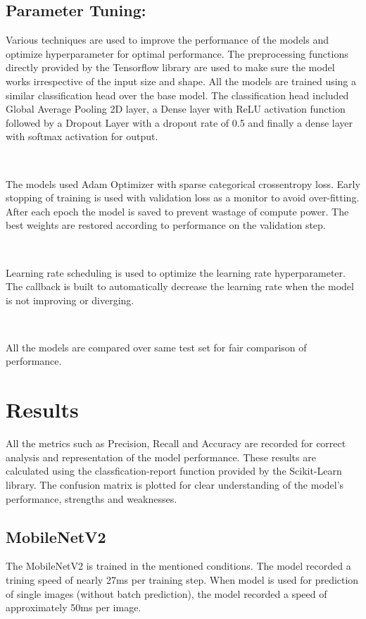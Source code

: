 \subsection{Parameter Tuning:} 

Various techniques are used to improve the performance of the models and optimize hyperparameter for optimal performance. The preprocessing functions directly provided by the Tensorflow library are used to make sure the model works irrespective of the input size and shape. All the models are trained using a similar classification head over the base model. The classification head included Global Average Pooling 2D layer, a Dense layer with ReLU activation function followed by a Dropout Layer with a dropout rate of 0.5 and finally a dense layer with softmax activation for output.

\

The models used Adam Optimizer with sparse categorical crossentropy loss. Early stopping of training is used with validation loss as a monitor to avoid over-fitting. After each epoch the model is saved to prevent wastage of compute power. The best weights are restored according to performance on the validation step.

\

Learning rate scheduling is used to optimize the learning rate hyperparameter. The callback is built to automatically decrease the learning rate when the model is not improving or diverging.

\

All the models are compared over same test set for fair comparison of performance. 




\section{Results} 

All the metrics such as Precision, Recall and Accuracy are recorded for correct analysis and representation of the model performance. These results are calculated using the classfication-report function provided by the Scikit-Learn library. The confusion matrix is plotted for clear understanding of the model's performance, strengths and weaknesses.

\subsection{MobileNetV2}

The MobileNetV2 is trained in the mentioned conditions. The model recorded a trining speed of nearly 27ms per training step. When model is used for prediction of single images (without batch prediction), the model recorded a speed of approximately 50ms per image. 

